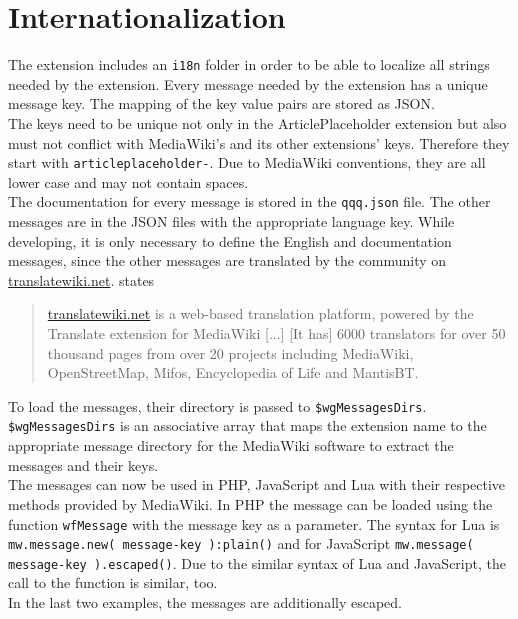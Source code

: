 \section{Internationalization}

The extension includes an \texttt{\justify i18n} folder in order to be able to localize all strings needed by the extension. Every message needed by the extension has a unique message key. The mapping of the key value pairs are stored as JSON. \\
The keys need to be unique not only in the ArticlePlaceholder extension but also must not conflict with MediaWiki's and its other extensions' keys. Therefore they start with \texttt{\justify articleplaceholder-}. Due to MediaWiki conventions, they are all lower case and may not contain spaces.  \\
The documentation for every message is stored in the \texttt{\justify qqq.json} file. The other messages are in the JSON files with the appropriate language key. While developing, it is only necessary to define the English and documentation messages, since the other messages are translated by the community on \url{translatewiki.net}.  \citet{wiki:26} states
\begin{quote}
 \url{translatewiki.net} is a web-based translation platform, powered by the Translate extension for MediaWiki [...] [It has] 6000 translators for over 50 thousand pages from over 20 projects including MediaWiki, OpenStreetMap, Mifos, Encyclopedia of Life and MantisBT.
\end{quote}

To load the messages, their directory is passed to \texttt{\justify \$wgMessagesDirs}. \texttt{\justify \$wgMessagesDirs} is an associative array that maps the extension name to the appropriate message directory for the MediaWiki software to extract the messages and their keys. \\
The messages can now be used in PHP, JavaScript and Lua with their respective methods provided by MediaWiki. In PHP the message can be loaded using the function \texttt{\justify wfMessage} with the message key as a parameter. The syntax for Lua is \texttt{\justify mw.message.new( message-key ):plain()} and for JavaScript \texttt{\justify mw.message( message-key ).escaped()}. Due to the similar syntax of Lua and JavaScript, the call to the function is similar, too. \\ In the last two examples, the messages are additionally escaped.
